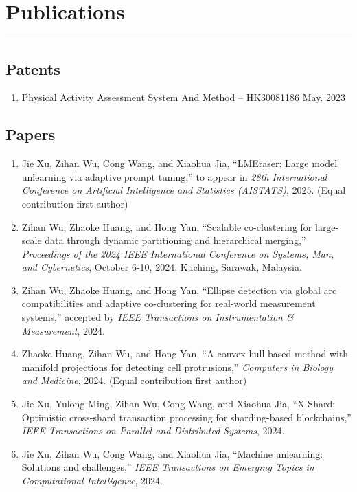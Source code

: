 \documentclass{article}
\newcommand{\cussection}[1]{\vspace{--0.05in}\section*{#1}\vspace{--0.1in} \hrule\vspace{0.2in} }
\begin{document}

\cussection{Publications}

\subsection*{Patents}
\begin{enumerate}
    \item Physical Activity Assessment System And Method -- HK30081186 \hfill May. 2023
\end{enumerate}


\subsection*{Papers}
\begin{enumerate}
    \item Jie Xu, Zihan Wu, Cong Wang, and Xiaohua Jia, ``LMEraser: Large model unlearning via adaptive prompt tuning,'' to appear in \emph{28th International Conference on Artificial Intelligence and Statistics (AISTATS)}, 2025. (Equal contribution first author)
    \item Zihan Wu, Zhaoke Huang, and Hong Yan, ``Scalable co-clustering for large-scale data through dynamic partitioning and hierarchical merging,'' \emph{Proceedings of the 2024 IEEE International Conference on Systems, Man, and Cybernetics}, October 6-10, 2024, Kuching, Sarawak, Malaysia.
    \item Zihan Wu, Zhaoke Huang, and Hong Yan, ``Ellipse detection via global arc compatibilities and adaptive co-clustering for real-world measurement systems,'' accepted by \emph{IEEE Transactions on Instrumentation \& Measurement}, 2024.
    \item Zhaoke Huang, Zihan Wu, and Hong Yan, ``A convex-hull based method with manifold projections for detecting cell protrusions,'' \emph{Computers in Biology and Medicine}, 2024. (Equal contribution first author)
    \item Jie Xu, Yulong Ming, Zihan Wu, Cong Wang, and Xiaohua Jia, ``X-Shard: Optimistic cross-shard transaction processing for sharding-based blockchains,'' \emph{IEEE Transactions on Parallel and Distributed Systems}, 2024.
    \item Jie Xu, Zihan Wu, Cong Wang, and Xiaohua Jia, ``Machine unlearning: Solutions and challenges,'' \emph{IEEE Transactions on Emerging Topics in Computational Intelligence}, 2024.
\end{enumerate}
\end{document}
